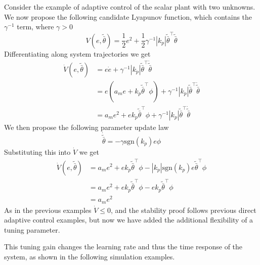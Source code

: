 \begin{example}
  Consider the example of adaptive control of the scalar plant with two unknowns.
  We now propose the following candidate Lyapunov function, which contains the $\gamma^{-1}$ term, where $\gamma>0$
  \begin{equation*}
    V(e,\tilde{\bar{\theta}})=\frac{1}{2}e^{2}+\frac{1}{2}\gamma^{-1}|k_{p}|\tilde{\bar{\theta}}^{\top}\tilde{\bar{\theta}}
  \end{equation*}
  Differentiating along system trajectories we get
  \begin{align*}
    \dot{V}(e,\tilde{\bar{\theta}})&=e\dot{e}+\gamma^{-1}|k_{p}|\tilde{\bar{\theta}}^{\top}\dot{\tilde{\bar{\theta}}} \\
    &=e(a_{m}e+k_{p}\tilde{\bar{\theta}}^{\top}\phi)+\gamma^{-1}|k_{p}|\tilde{\bar{\theta}}^{\top}\dot{\tilde{\bar{\theta}}} \\
    &=a_{m}e^{2}+ek_{p}\tilde{\bar{\theta}}^{\top}\phi+\gamma^{-1}|k_{p}|\tilde{\bar{\theta}}^{\top}\dot{\tilde{\bar{\theta}}}
  \end{align*}
  We then propose the following parameter update law
  \begin{equation*}
    \dot{\tilde{\bar{\theta}}}=-\gamma\text{sgn}(k_{p})e\phi
  \end{equation*}
  Substituting this into $\dot{V}$ we get
  \begin{align*}
    \dot{V}(e,\tilde{\bar{\theta}})&=a_{m}e^{2}+ek_{p}\tilde{\bar{\theta}}^{\top}\phi-|k_{p}|\text{sgn}(k_{p})e\tilde{\bar{\theta}}^{\top}\phi \\
    &=a_{m}e^{2}+ek_{p}\tilde{\bar{\theta}}^{\top}\phi-ek_{p}\tilde{\bar{\theta}}^{\top}\phi \\
    &=a_{m}e^{2}
  \end{align*}
  As in the previous examples $\dot{V}\leq0$, and the stability proof follows previous direct adaptive control examples, but now we have added the additional flexibility of a tuning parameter.
\end{example}

This tuning gain changes the learning rate and thus the time response of the system, as shown in the following simulation examples.

